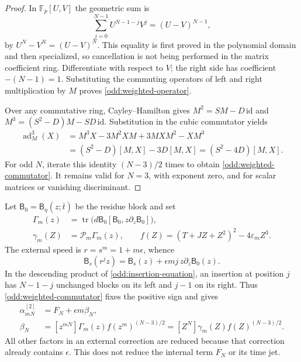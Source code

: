 \begin{proof}
In $\mathbb F_p[U,V]$ the geometric sum is
\[
 \sum_{j=0}^{N-1}U^{N-1-j}V^j=(U-V)^{N-1},
\]
by $U^N-V^N=(U-V)^N$. This equality is first proved in the
polynomial domain and then specialized, so cancellation is not
being performed in the matrix coefficient ring. Differentiate
with respect to $V$; the right side has coefficient $-(N-1)=1$.
Substituting the commuting operators of left and right
multiplication by $M$ proves \eqref{odd:weighted-operator}.

Over any commutative ring, Cayley--Hamilton gives
$M^2=SM-D\,\mathrm{id}$ and
$M^3=(S^2-D)M-SD\,\mathrm{id}$. Substitution in the cubic
commutator yields
\[
 \begin{split}
 \operatorname{ad}_M^3(X)
 &=M^3X-3M^2XM+3MXM^2-XM^3\\
 &=(S^2-D)[M,X]-3D[M,X]
 =(S^2-4D)[M,X].
 \end{split}
\]
For odd $N$, iterate this identity $ (N-3)/2 $ times to obtain
\eqref{odd:weighted-commutator}. It remains valid for $N=3$, with
exponent zero, and for scalar matrices or vanishing discriminant.
\end{proof}

Let $\mathsf B_0=\mathsf B_\eta(z;\bar t)$ be the residue block and set
\begin{equation}
 \begin{split}
 \Gamma_m(z)&=\operatorname{tr}\bigl(
 d\mathsf B_0[\mathsf B_0,z\partial_z\mathsf B_0]\bigr),\\
 \gamma_m(Z)&=\mathcal P_m\Gamma_m(z),\qquad
 f(Z)=(T+JZ+Z^2)^2-4\varepsilon_m Z^3.
 \end{split}
 \label{odd:external-data}
\end{equation}
The external speed is $r=s^m=1+m\epsilon$, whence
\[
 \mathsf B_s(r^jz)=\mathsf B_s(z)
       +\epsilon mj\,z\partial_z\mathsf B_0(z).
\]
In the descending product of \eqref{odd:insertion-equation}, an
insertion at position $j$ has $N-1-j$ unchanged blocks on its
left and $j-1$ on its right. Thus
\eqref{odd:weighted-commutator} fixes the positive sign and gives
\begin{equation}
 \begin{split}
 \alpha_{mN}^{[2]}&=F_N+\epsilon m\beta_N,\\
 \beta_N&=[z^{mN}]\Gamma_m(z)f(z^m)^{(N-3)/2}
        =[Z^N]\gamma_m(Z)f(Z)^{(N-3)/2}.
 \end{split}
 \label{odd:external-coefficient}
\end{equation}
All other factors in an external correction are reduced because
that correction already contains $\epsilon$. This does not reduce
the internal term $F_N$ or its time jet.

